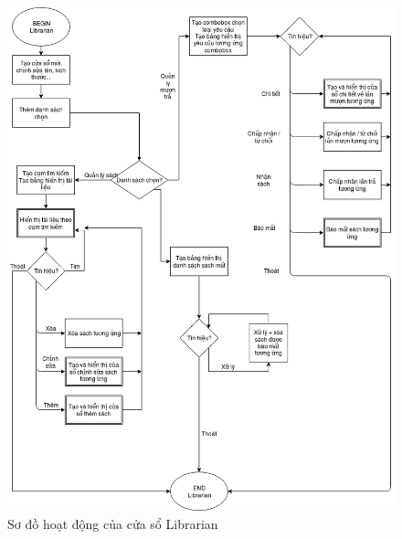 \documentclass[a4paper]{article}
\begin{document}
	\newpage \newpage 
\begin{figure}[h!]
	\begin{center}
		\includegraphics[scale=.5]{librarianDiagram.png}
		\caption{Sơ đồ hoạt động của cửa sổ Librarian}
	\end{center}
\end{figure}
	\newpage \newpage 
\end{document}
